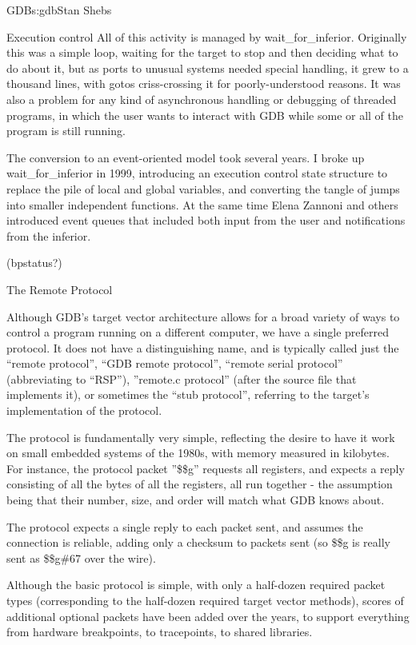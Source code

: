 \begin{aosachapter}{GDB}{s:gdb}{Stan Shebs}
\begin{aosasect1}{Execution control}
All of this activity is managed by wait\_for\_inferior.  Originally this
was a simple loop, waiting for the target to stop and then deciding
what to do about it, but as ports to unusual systems needed special
handling, it grew to a thousand lines, with gotos criss-crossing it
for poorly-understood reasons.  It was also a problem for any kind of
asynchronous handling or debugging of threaded programs, in which the
user wants to interact with GDB while some or all of the program is
still running.

The conversion to an event-oriented model took several years.  I broke
up wait\_for\_inferior in 1999, introducing an execution control state
structure to replace the pile of local and global variables, and
converting the tangle of jumps into smaller independent functions.  At
the same time Elena Zannoni and others introduced event queues that
included both input from the user and notifications from the inferior.

(bpstatus?)

\end{aosasect1}

\begin{aosasect1}{The Remote Protocol}

Although GDB's target vector architecture allows for a broad variety
of ways to control a program running on a different computer, we have
a single preferred protocol.  It does not have a distinguishing name,
and is typically called just the ``remote protocol'', ``GDB remote
protocol'', ``remote serial protocol'' (abbreviating to ``RSP''),
''remote.c protocol'' (after the source file that implements it), or
sometimes the ``stub protocol'', referring to the target's
implementation of the protocol.

The protocol is fundamentally very simple, reflecting the desire to
have it work on small embedded systems of the 1980s, with memory
measured in kilobytes.  For instance, the protocol packet ''\$\$g''
requests all registers, and expects a reply consisting of all the
bytes of all the registers, all run together - the assumption being
that their number, size, and order will match what GDB knows about.

The protocol expects a single reply to each packet sent, and assumes
the connection is reliable, adding only a checksum to packets sent
(so \$\$g is really sent as \$\$g\#67 over the wire).

Although the basic protocol is simple, with only a half-dozen required
packet types (corresponding to the half-dozen required target vector
methods), scores of additional optional packets have been added over the
years, to support everything from hardware breakpoints, to tracepoints, to
shared libraries.


\end{aosasect1}
\end{aosachapter}
